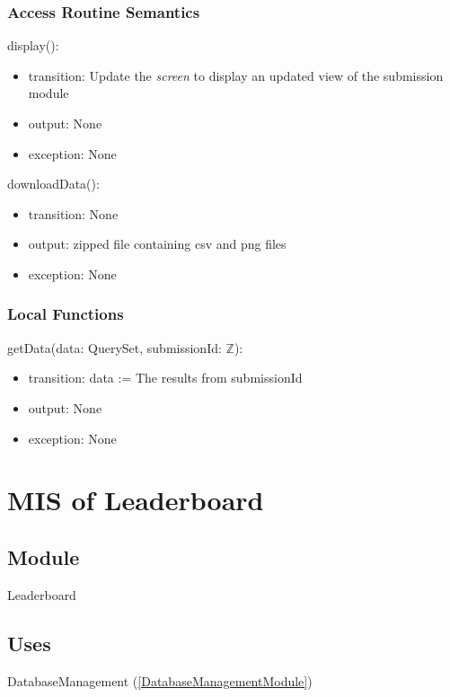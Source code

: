 \documentclass[12pt, titlepage]{article}
\begin{document}
\subsubsection{Access Routine Semantics}

\noindent display():
\begin{itemize}
\item transition: Update the \textit{screen} to display an updated view of the submission module
\item output: None
\item exception: None
\end{itemize}

\noindent downloadData():
\begin{itemize}
\item transition: None
\item output: zipped file containing csv and png files
\item exception: None
\end{itemize}

\subsubsection{Local Functions}

\noindent getData(data: QuerySet, submissionId: $\mathbb{Z}$):
\begin{itemize}
\item transition: data := The results from submissionId
\item output: None
\item exception: None
\end{itemize}

\newpage

\section{MIS of Leaderboard} \label{LeaderboardModule}

\subsection{Module}

Leaderboard

\subsection{Uses}

DatabaseManagement (\ref{DatabaseManagementModule})
\end{document}
